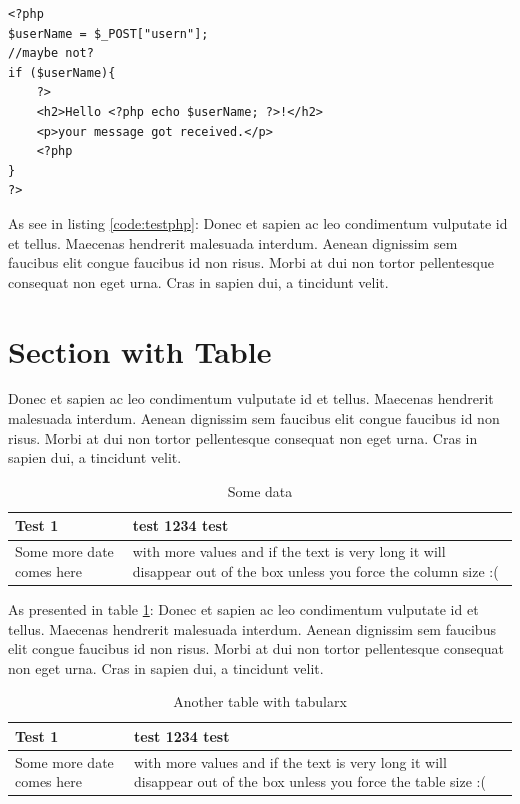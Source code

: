 \documentclass[11pt,a4paper,oneside,article]{memoir}
\newenvironment{code}{\captionsetup{type=listing}}{}
\begin{document}
\begin{code}
  \label{code:testphp}
  \begin{verbatim}
<?php
$userName = $_POST["usern"];
//maybe not?
if ($userName){
	?>
	<h2>Hello <?php echo $userName; ?>!</h2>
	<p>your message got received.</p>
	<?php
}
?>
\end{verbatim}
\end{code}


As see in listing \ref{code:testphp}: Donec et sapien ac leo condimentum vulputate id et tellus. Maecenas hendrerit malesuada interdum. Aenean dignissim sem faucibus elit congue faucibus id non risus. Morbi at dui non tortor pellentesque consequat non eget urna. Cras in sapien dui, a tincidunt velit.

\section{Section with Table}
Donec et sapien ac leo condimentum vulputate id et tellus. Maecenas hendrerit malesuada interdum. Aenean dignissim sem faucibus elit congue faucibus id non risus. Morbi at dui non tortor pellentesque consequat non eget urna. Cras in sapien dui, a tincidunt velit.

\begin{table}[h]
  \centering
  \caption{Some data}
  \begin{tabular}{| l | >{\centering\arraybackslash}p{} |}
    \hline
    Test 1 & test 1234 test \\
    \hline
    Some more date comes here & with more values and if the text is very long it will disappear out of the box unless you force the column size :( \\
    \hline
  \end{tabular}
  \label{table:some_data}
\end{table}


As presented in table \ref{table:some_data}: Donec et sapien ac leo condimentum vulputate id et tellus. Maecenas hendrerit malesuada interdum. Aenean dignissim sem faucibus elit congue faucibus id non risus. Morbi at dui non tortor pellentesque consequat non eget urna. Cras in sapien dui, a tincidunt velit.

\begin{table}[h]
  \centering
  \caption{Another table with tabularx}
  \begin{tabularx}{.95\textwidth}{| l | >{\centering\arraybackslash} X |}
    \hline
    Test 1 & test 1234 test \\
    \hline
    Some more date comes here & with more values and if the text is very long it will disappear out of the box unless you force the table size :( \\
    \hline
  \end{tabularx}
  \label{table:some_data2}
\end{table}
\end{document}
